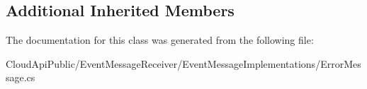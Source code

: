 \subsection*{Additional Inherited Members}


The documentation for this class was generated from the following file\-:\begin{DoxyCompactItemize}
\item 
Cloud\-Api\-Public/\-Event\-Message\-Receiver/\-Event\-Message\-Implementations/Error\-Message.\-cs\end{DoxyCompactItemize}

